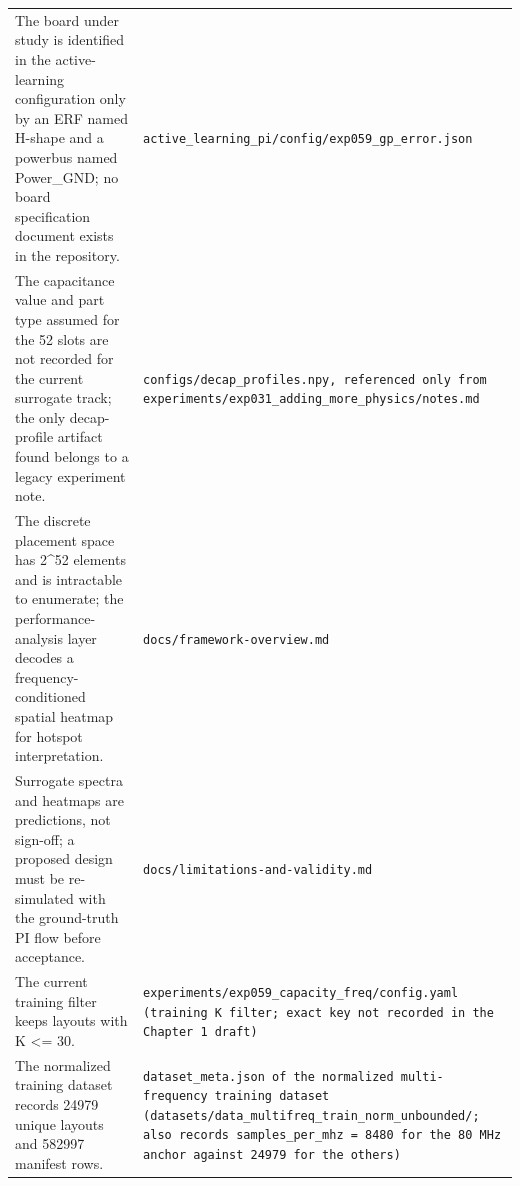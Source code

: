 \begin{longtable}{p{} p{}}
The board under study is identified in the active-learning configuration only by an ERF named H-shape and a powerbus named Power\_GND; no board specification document exists in the repository. & \texttt{active\_\allowbreak{}learning\_\allowbreak{}pi/\allowbreak{}config/\allowbreak{}exp059\_\allowbreak{}gp\_\allowbreak{}error.json} \\
The capacitance value and part type assumed for the 52 slots are not recorded for the current surrogate track; the only decap-profile artifact found belongs to a legacy experiment note. & \texttt{configs/\allowbreak{}decap\_\allowbreak{}profiles.npy, referenced only from experiments/\allowbreak{}exp031\_\allowbreak{}adding\_\allowbreak{}more\_\allowbreak{}physics/\allowbreak{}notes.md} \\
The discrete placement space has 2\textasciicircum{}52 elements and is intractable to enumerate; the performance-analysis layer decodes a frequency-conditioned spatial heatmap for hotspot interpretation. & \texttt{docs/\allowbreak{}framework-overview.md} \\
Surrogate spectra and heatmaps are predictions, not sign-off; a proposed design must be re-simulated with the ground-truth PI flow before acceptance. & \texttt{docs/\allowbreak{}limitations-and-validity.md} \\
The current training filter keeps layouts with K <= 30. & \texttt{experiments/\allowbreak{}exp059\_\allowbreak{}capacity\_\allowbreak{}freq/\allowbreak{}config.yaml (training K filter; exact key not recorded in the Chapter 1 draft)} \\
The normalized training dataset records 24979 unique layouts and 582997 manifest rows. & \texttt{dataset\_\allowbreak{}meta.json of the normalized multi-frequency training dataset (datasets/\allowbreak{}data\_\allowbreak{}multifreq\_\allowbreak{}train\_\allowbreak{}norm\_\allowbreak{}unbounded/\allowbreak{}; also records samples\_\allowbreak{}per\_\allowbreak{}mhz = 8480 for the 80 MHz anchor against 24979 for the others)} \\
\hline
\end{longtable}
\endgroup

